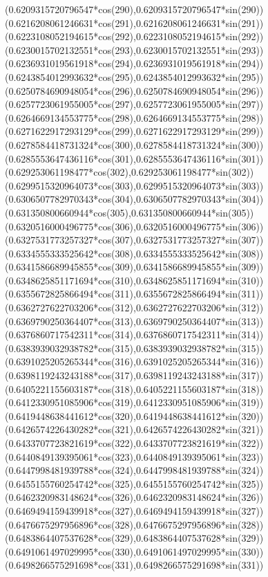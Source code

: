 {({0.6209315720796547*cos(290)},{0.6209315720796547*sin(290)})
({0.6216208061246631*cos(291)},{0.6216208061246631*sin(291)})
({0.6223108052194615*cos(292)},{0.6223108052194615*sin(292)})
({0.6230015702132551*cos(293)},{0.6230015702132551*sin(293)})
({0.6236931019561918*cos(294)},{0.6236931019561918*sin(294)})
({0.6243854012993632*cos(295)},{0.6243854012993632*sin(295)})
({0.6250784690948054*cos(296)},{0.6250784690948054*sin(296)})
({0.6257723061955005*cos(297)},{0.6257723061955005*sin(297)})
({0.6264669134553775*cos(298)},{0.6264669134553775*sin(298)})
({0.6271622917293129*cos(299)},{0.6271622917293129*sin(299)})
({0.6278584418731324*cos(300)},{0.6278584418731324*sin(300)})
({0.6285553647436116*cos(301)},{0.6285553647436116*sin(301)})
({0.629253061198477*cos(302)},{0.629253061198477*sin(302)})
({0.6299515320964073*cos(303)},{0.6299515320964073*sin(303)})
({0.6306507782970343*cos(304)},{0.6306507782970343*sin(304)})
({0.631350800660944*cos(305)},{0.631350800660944*sin(305)})
({0.6320516000496775*cos(306)},{0.6320516000496775*sin(306)})
({0.6327531773257327*cos(307)},{0.6327531773257327*sin(307)})
({0.6334555333525642*cos(308)},{0.6334555333525642*sin(308)})
({0.6341586689945855*cos(309)},{0.6341586689945855*sin(309)})
({0.6348625851171694*cos(310)},{0.6348625851171694*sin(310)})
({0.6355672825866494*cos(311)},{0.6355672825866494*sin(311)})
({0.6362727622703206*cos(312)},{0.6362727622703206*sin(312)})
({0.6369790250364407*cos(313)},{0.6369790250364407*sin(313)})
({0.6376860717542311*cos(314)},{0.6376860717542311*sin(314)})
({0.6383939032938782*cos(315)},{0.6383939032938782*sin(315)})
({0.6391025205265344*cos(316)},{0.6391025205265344*sin(316)})
({0.6398119243243188*cos(317)},{0.6398119243243188*sin(317)})
({0.6405221155603187*cos(318)},{0.6405221155603187*sin(318)})
({0.6412330951085906*cos(319)},{0.6412330951085906*sin(319)})
({0.6419448638441612*cos(320)},{0.6419448638441612*sin(320)})
({0.6426574226430282*cos(321)},{0.6426574226430282*sin(321)})
({0.6433707723821619*cos(322)},{0.6433707723821619*sin(322)})
({0.6440849139395061*cos(323)},{0.6440849139395061*sin(323)})
({0.6447998481939788*cos(324)},{0.6447998481939788*sin(324)})
({0.6455155760254742*cos(325)},{0.6455155760254742*sin(325)})
({0.6462320983148624*cos(326)},{0.6462320983148624*sin(326)})
({0.6469494159439918*cos(327)},{0.6469494159439918*sin(327)})
({0.6476675297956896*cos(328)},{0.6476675297956896*sin(328)})
({0.6483864407537628*cos(329)},{0.6483864407537628*sin(329)})
({0.6491061497029995*cos(330)},{0.6491061497029995*sin(330)})
({0.6498266575291698*cos(331)},{0.6498266575291698*sin(331)})
}
